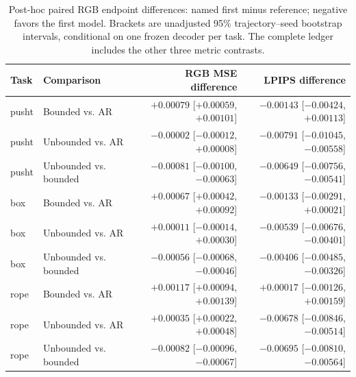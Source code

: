 \begin{table}[tbp]\centering\small
\begin{tabular}{@{}llrr@{}}\toprule
Task & Comparison & RGB MSE difference & LPIPS difference \\ \midrule
pusht & Bounded vs. AR & $+0.00079$ [$+0.00059$, $+0.00101$] & $-0.00143$ [$-0.00424$, $+0.00113$] \\
pusht & Unbounded vs. AR & $-0.00002$ [$-0.00012$, $+0.00008$] & $-0.00791$ [$-0.01045$, $-0.00558$] \\
pusht & Unbounded vs. bounded & $-0.00081$ [$-0.00100$, $-0.00063$] & $-0.00649$ [$-0.00756$, $-0.00541$] \\
box & Bounded vs. AR & $+0.00067$ [$+0.00042$, $+0.00092$] & $-0.00133$ [$-0.00291$, $+0.00021$] \\
box & Unbounded vs. AR & $+0.00011$ [$-0.00014$, $+0.00030$] & $-0.00539$ [$-0.00676$, $-0.00401$] \\
box & Unbounded vs. bounded & $-0.00056$ [$-0.00068$, $-0.00046$] & $-0.00406$ [$-0.00485$, $-0.00326$] \\
rope & Bounded vs. AR & $+0.00117$ [$+0.00094$, $+0.00139$] & $+0.00017$ [$-0.00126$, $+0.00159$] \\
rope & Unbounded vs. AR & $+0.00035$ [$+0.00022$, $+0.00048$] & $-0.00678$ [$-0.00846$, $-0.00514$] \\
rope & Unbounded vs. bounded & $-0.00082$ [$-0.00096$, $-0.00067$] & $-0.00695$ [$-0.00810$, $-0.00564$] \\
\bottomrule\end{tabular}
\caption{Post-hoc paired RGB endpoint differences: named first minus reference; negative favors the first model. Brackets are unadjusted 95\% trajectory--seed bootstrap intervals, conditional on one frozen decoder per task. The complete ledger includes the other three metric contrasts.}
\label{tab:rgb-endpoint-paired}\end{table}
